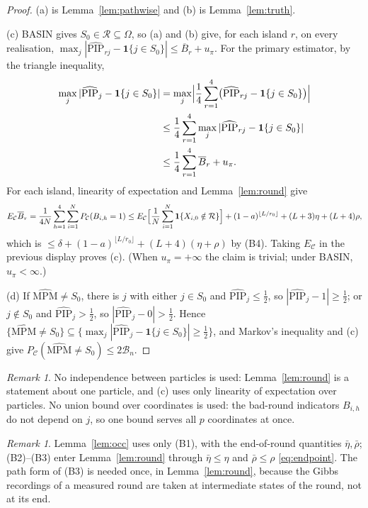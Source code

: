 \documentclass[11pt]{article}
\theoremstyle{remark}
\newtheorem{remark}[theorem]{Remark}
\newcommand{\one}{\mathbf 1}
\newcommand{\R}{\mathcal R}
\newcommand{\C}{\mathcal C}
\newcommand{\PIP}{\widehat{\mathrm{PIP}}}
\newcommand{\Pc}{P_{\C}}
\newcommand{\Ec}{E_{\C}}
\begin{document}
\begin{proof}
(a) is Lemma~\ref{lem:pathwise} and (b) is Lemma~\ref{lem:truth}.

(c) BASIN gives $S_0\in\R\subseteq\Omega$, so (a) and (b) give, for each island $r$, on every realisation,
$\max_j|\PIP_{rj}-\one\{j\in S_0\}|\le\overline B_r+u_\pi$. For the primary estimator, by the triangle inequality,
\begin{align*}
\max_j|\PIP_j-\one\{j\in S_0\}|&=\max_j\Bigl|\frac14\sum_{r=1}^4\bigl(\PIP_{rj}-\one\{j\in S_0\}\bigr)\Bigr|\\
&\le\frac14\sum_{r=1}^4\max_j|\PIP_{rj}-\one\{j\in S_0\}|\\
&\le\frac14\sum_{r=1}^4\overline B_r+u_\pi .
\end{align*}
For each island, linearity of expectation and Lemma~\ref{lem:round} give
\[
\Ec\overline B_r=\frac1{4N}\sum_{h=1}^4\sum_{i=1}^N\Pc(B_{i,h}=1)
\le\Ec\Bigl[\frac1N\sum_{i=1}^N\one\{X_{i,0}\notin\R\}\Bigr]+(1-a)^{\lfloor L/r_0\rfloor}+(L+3)\eta+(L+4)\rho,
\]
which is $\le\delta+(1-a)^{\lfloor L/r_0\rfloor}+(L+4)(\eta+\rho)$ by (B4). Taking $\Ec$ in the previous display proves (c). (When $u_\pi=+\infty$ the claim is trivial; under BASIN, $u_\pi<\infty$.)

(d) If $\widehat{\mathrm{MPM}}\neq S_0$, there is $j$ with either $j\in S_0$ and $\PIP_j\le\frac12$, so $|\PIP_j-1|\ge\frac12$; or $j\notin S_0$ and $\PIP_j>\frac12$, so $|\PIP_j-0|>\frac12$. Hence $\{\widehat{\mathrm{MPM}}\ne S_0\}\subseteq\{\max_j|\PIP_j-\one\{j\in S_0\}|\ge\frac12\}$, and Markov's inequality and (c) give $\Pc(\widehat{\mathrm{MPM}}\ne S_0)\le2\mathcal B_n$.
\end{proof}

\begin{remark}
No independence between particles is used: Lemma~\ref{lem:round} is a statement about one particle, and (c) uses only linearity of expectation over particles. No union bound over coordinates is used: the bad-round indicators $B_{i,h}$ do not depend on $j$, so one bound serves all $p$ coordinates at once.
\end{remark}

\begin{remark}
Lemma~\ref{lem:occ} uses only (B1), with the end-of-round quantities $\bar\eta,\bar\rho$; (B2)--(B3) enter Lemma~\ref{lem:round} through $\bar\eta\le\eta$ and $\bar\rho\le\rho$ \eqref{eq:endpoint}. The path form of (B3) is needed once, in Lemma~\ref{lem:round}, because the Gibbs recordings of a measured round are taken at intermediate states of the round, not at its end.
\end{remark}
\end{document}
